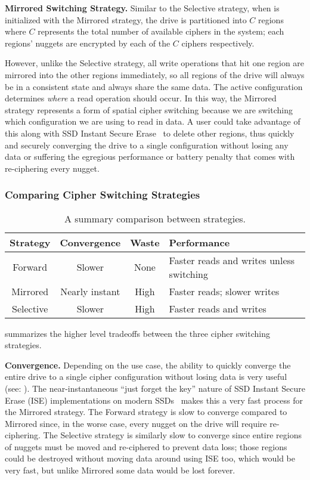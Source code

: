 \textbf{Mirrored Switching Strategy.} Similar to the Selective strategy, when
\sys is initialized with the Mirrored strategy, the drive is partitioned
into $C$ regions where $C$ represents the total number of available ciphers in
the system; each regions' nuggets are encrypted by each of the $C$ ciphers
respectively.

However, unlike the Selective strategy, all write operations that hit one region
are mirrored into the other regions immediately, so all regions of the drive
will always be in a consistent state and always share the same data. The active
configuration determines \emph{where} a read operation should occur. In this
way, the Mirrored strategy represents a form of spatial cipher switching because
we are switching which configuration we are using to read in data. A user could
take advantage of this along with SSD Instant Secure Erase~\cite{ISE1,ISE2,ISE3}
to delete other regions, thus quickly and securely converging the drive to a
single configuration without losing any data or suffering the egregious
performance or battery penalty that comes with re-ciphering every nugget.

\subsubsection{Comparing Cipher Switching Strategies}

\begin{table}[ht]
   \begin{tabular}{@{}|c|c|c|C{25mm}|@{}}
      \toprule
      \textbf{Strategy} & \textbf{Convergence} & \textbf{Waste} &
      \textbf{Performance} \\
      \midrule
      Forward   & Slower       & None & Faster reads and writes unless switching
      \\\hline
      Mirrored  & Nearly instant & High & Faster reads; slower writes \\
      \hline
      Selective & Slower       & High & Faster reads and writes  \\
      \hline
   \end{tabular}
   \caption{A summary comparison between strategies.}
   \label{tbl:strategies-advantages}
\end{table}

 summarizes the higher level tradeoffs between the
three cipher switching strategies.

\textbf{Convergence.} Depending on the use case, the ability to quickly converge
the entire drive to a single cipher configuration without losing data is very
useful (see: ). The near-instantaneous ``just forget the key''
nature of SSD Instant Secure Erase (ISE) implementations on modern
SSDs~\cite{ISE1,ISE2,ISE3} makes this a very fast process for the Mirrored
strategy. The Forward strategy is slow to converge compared to Mirrored since,
in the worse case, every nugget on the drive will require re-ciphering. The
Selective strategy is similarly slow to converge since entire regions of nuggets
must be moved and re-ciphered to prevent data loss; those regions could be
destroyed without moving data around using ISE too, which would be very fast,
but unlike Mirrored some data would be lost forever.

